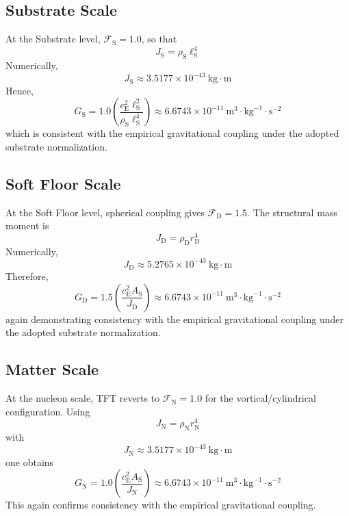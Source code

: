 \subsection{Substrate Scale}
At the Substrate level, $\mathcal{F}_{\mathrm{S}} = 1.0$, so that
\begin{equation}
    J_{\mathrm{S}} = \rho_{\mathrm{S}} \ell_{\mathrm{S}}^4
\end{equation}
Numerically,
\begin{equation}
    J_{\mathrm{S}} \approx 3.5177 \times 10^{-43}\ \text{kg}\cdot\text{m}
\end{equation}
Hence,
\begin{equation}
    G_{\mathrm{S}} = 1.0 \left(\frac{c_{\mathrm{E}}^2 \ell_{\mathrm{S}}^2}{\rho_{\mathrm{S}} \ell_{\mathrm{S}}^4}\right) \approx 6.6743 \times 10^{-11}\ \text{m}^3\cdot\text{kg}^{-1}\cdot\text{s}^{-2}
\end{equation}
which is consistent with the empirical gravitational coupling under the adopted substrate normalization.

\subsection{Soft Floor Scale}
At the Soft Floor level, spherical coupling gives $\mathcal{F}_{\mathrm{D}} = 1.5$. The structural mass moment is
\begin{equation}
    J_{\mathrm{D}} = \rho_{\mathrm{D}} r_{\mathrm{D}}^4
\end{equation}
Numerically,
\begin{equation}
    J_{\mathrm{D}} \approx 5.2765 \times 10^{-43}\ \text{kg}\cdot\text{m}
\end{equation}
Therefore,
\begin{equation}
    G_{\mathrm{D}} = 1.5 \left(\frac{c_{\mathrm{E}}^2 A_{\mathrm{S}}}{J_{\mathrm{D}}}\right) \approx 6.6743 \times 10^{-11}\ \text{m}^3\cdot\text{kg}^{-1}\cdot\text{s}^{-2}
\end{equation}
again demonstrating consistency with the empirical gravitational coupling under the adopted substrate normalization.

\subsection{Matter Scale}
At the nucleon scale, TFT reverts to $\mathcal{F}_{\mathrm{N}} = 1.0$ for the vortical/cylindrical configuration. Using
\begin{equation}
    J_{\mathrm{N}} = \rho_{\mathrm{N}} r_{\mathrm{N}}^4
\end{equation}
with
\begin{equation}
    J_{\mathrm{N}} \approx 3.5177 \times 10^{-43}\ \text{kg}\cdot\text{m}
\end{equation}
one obtains
\begin{equation}
    G_{\mathrm{N}} = 1.0 \left(\frac{c_{\mathrm{E}}^2 A_{\mathrm{S}}}{J_{\mathrm{N}}}\right) \approx 6.6743 \times 10^{-11}\ \text{m}^3\cdot\text{kg}^{-1}\cdot\text{s}^{-2}
\end{equation}
This again confirms consistency with the empirical gravitational coupling.

